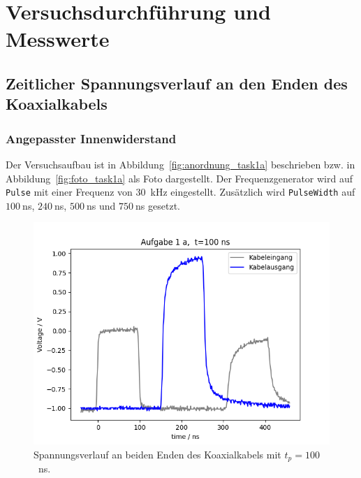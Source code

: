 \documentclass{article}
\begin{document}
\section{Versuchsdurchführung und Messwerte}

\subsection{Zeitlicher Spannungsverlauf an den Enden des Koaxialkabels}

\subsubsection{Angepasster Innenwiderstand}

Der Versuchsaufbau ist in Abbildung~\ref{fig:anordnung_task1a} beschrieben bzw. in Abbildung~\ref{fig:foto_task1a} als Foto dargestellt. Der Frequenzgenerator wird auf \texttt{Pulse} mit einer Frequenz von 30~kHz eingestellt. Zusätzlich wird \texttt{PulseWidth} auf $100~$ns, $240~$ns, $500~$ns und $750~$ns gesetzt.



\begin{figure}[H]
\centering
\caption{Spannungsverlauf an beiden Enden des Koaxialkabels mit $t_p=100$~ns.}
\label{fig:task1a_100ns}
\includegraphics[scale=0.6]{bilder/task1a/task1a_100ns.png}
\end{figure}
\end{document}
